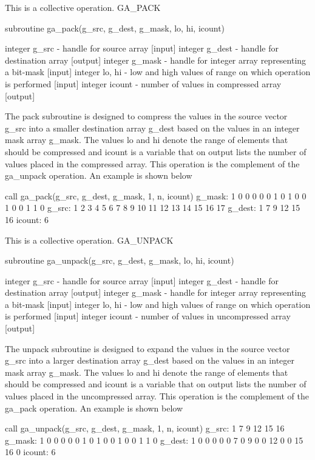 This is a collective operation. GA\_PACK

subroutine ga\_pack(g\_src, g\_dest, g\_mask, lo, hi, icount)

integer g\_src - handle for source array {[}input{]} integer g\_dest
- handle for destination array {[}output{]} integer g\_mask - handle
for integer array representing a bit-mask {[}input{]} integer lo,
hi - low and high values of range on which operation is performed
{[}input{]} integer icount - number of values in compressed array
{[}output{]}

The pack subroutine is designed to compress the values in the source
vector g\_src into a smaller destination array g\_dest based on the
values in an integer mask array g\_mask. The values lo and hi denote
the range of elements that should be compressed and icount is a variable
that on output lists the number of values placed in the compressed
array. This operation is the complement of the ga\_unpack operation.
An example is shown below

call ga\_pack(g\_src, g\_dest, g\_mask, 1, n, icount) g\_mask: 1 0
0 0 0 0 1 0 1 0 0 1 0 0 1 1 0 g\_src: 1 2 3 4 5 6 7 8 9 10 11 12 13
14 15 16 17 g\_dest: 1 7 9 12 15 16 icount: 6

This is a collective operation. GA\_UNPACK

subroutine ga\_unpack(g\_src, g\_dest, g\_mask, lo, hi, icount)

integer g\_src - handle for source array {[}input{]} integer g\_dest
- handle for destination array {[}output{]} integer g\_mask - handle
for integer array representing a bit-mask {[}input{]} integer lo,
hi - low and high values of range on which operation is performed
{[}input{]} integer icount - number of values in uncompressed array
{[}output{]}

The unpack subroutine is designed to expand the values in the source
vector g\_src into a larger destination array g\_dest based on the
values in an integer mask array g\_mask. The values lo and hi denote
the range of elements that should be compressed and icount is a variable
that on output lists the number of values placed in the uncompressed
array. This operation is the complement of the ga\_pack operation.
An example is shown below

call ga\_unpack(g\_src, g\_dest, g\_mask, 1, n, icount) g\_src: 1
7 9 12 15 16 g\_mask: 1 0 0 0 0 0 1 0 1 0 0 1 0 0 1 1 0 g\_dest: 1
0 0 0 0 0 7 0 9 0 0 12 0 0 15 16 0 icount: 6

